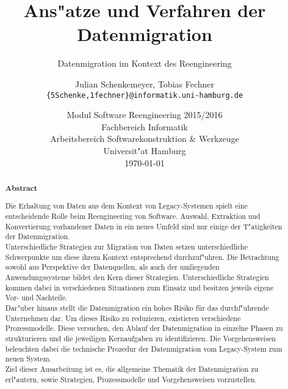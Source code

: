 \documentclass[11pt]{scrartcl}
\begin{document}
\clearpage
\thispagestyle{empty}
	
\title{Ans"atze und Verfahren der Datenmigration}

\subtitle{Datenmigration im Kontext des Reengineering} 

\author{Julian Schenkemeyer, Tobias Fechner\\
	{\texttt{\{5Schenke,1fechner\}@informatik.uni-hamburg.de}}}

\date{Modul Software Reengineering 2015/2016\\
  \small Fachbereich Informatik\\ 
  Arbeitsbereich Softwarekonstruktion \& Werkzeuge\\ 
  Universit"at Hamburg\\[4mm]
  \today}

\maketitle

\begin{abstract}
	\small\noindent\textbf{Abstract}

	\noindent Die Erhaltung von Daten aus dem Kontext von Legacy-Systemen spielt eine entscheidende Rolle beim Reengineering von Software. Auswahl, Extraktion und Konvertierung vorhandener Daten in ein neues Umfeld sind nur einige der T"atigkeiten der Datenmigration. \\
	Unterschiedliche Strategien zur Migration von Daten setzen unterschiedliche Schwerpunkte um diese ihrem Kontext entsprechend durchzuf"uhren. Die Betrachtung sowohl aus Perspektive der Datenquellen, als auch der umliegenden Anwendungssysteme bildet den Kern dieser Strategien. Unterschiedliche Strategien kommen dabei in verschiedenen Situationen zum Einsatz und besitzen jeweils eigene Vor- und Nachteile. \\
	Dar"uber hinaus stellt die Datenmigration ein hohes Risiko für das durchf"uhrende Unternehmen dar. Um dieses Risiko zu reduzieren, existieren verschiedene Prozessmodelle. Diese versuchen, den Ablauf der Datenmigration in einzelne Phasen zu strukturieren und die jeweiligen Kernaufgaben zu identifizieren. Die Vorgehensweisen beleuchten dabei die technische Prozedur der Datenmigration vom Legacy-System zum neuen System. \\
	Ziel dieser Ausarbeitung ist es, die allgemeine Thematik der Datenmigration zu erl"autern, sowie Strategien, Prozessmodelle und Vorgehensweisen vorzustellen.
\end{abstract}
\end{document}
